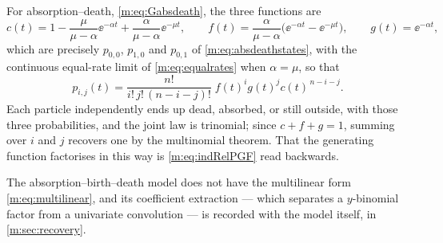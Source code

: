 For absorption--death, \cref{m:eq:Gabsdeath}, the three functions are
\begin{equation*}
c(t) = 1-\frac{\mu}{\mu-\alpha}\ee^{-\alpha t} + \frac{\alpha}{\mu-\alpha}\ee^{-\mu t},
\qquad
f(t) = \frac{\alpha}{\mu-\alpha}\bigl(\ee^{-\alpha t}-\ee^{-\mu t}\bigr),
\qquad
g(t) = \ee^{-\alpha t},
\end{equation*}
which are precisely $p_{0,0}$, $p_{1,0}$ and $p_{0,1}$ of
\cref{m:eq:absdeathstates}, with the continuous equal-rate limit of
\cref{m:eq:equalrates} when $\alpha=\mu$, so that
\begin{equation*}
p_{i,j}(t) = \frac{n!}{i!\,j!\,(n-i-j)!}\;f(t)^{i}g(t)^{j}c(t)^{\,n-i-j} .
\end{equation*}
Each particle independently ends up dead, absorbed, or still outside, with those
three probabilities, and the joint law is trinomial; since $c+f+g=1$, summing over
$i$ and $j$ recovers one by the multinomial theorem. That the generating function
factorises in this way is \cref{m:eq:indRelPGF} read backwards.

The absorption--birth--death model does not have the multilinear form
\cref{m:eq:multilinear}, and its coefficient extraction --- which separates a
$y$-binomial factor from a univariate convolution --- is recorded with the model
itself, in \cref{m:sec:recovery}.
